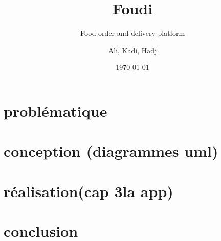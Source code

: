 \documentclass[a4paper]{report}
\title{\textbf{Foudi}}
\subtitle{Food order and delivery platform}
\author{Ali, Kadi, Hadj}
\date{\today}
\begin{document}
\maketitle

\tableofcontents


\chapter{problématique}
\chapter{conception (diagrammes uml)}
\chapter{réalisation(cap 3la app)}
\chapter{conclusion}
\end{document}

